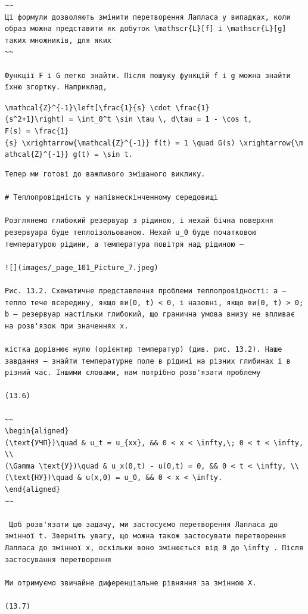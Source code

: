 \documentclass[
  ukrainian,
]{article}
\begin{document}
\begin{verbatim}
~~
Ці формули дозволяють змінити перетворення Лапласа у випадках, коли образ можна представити як добуток \mathscr{L}[f] і \mathscr{L}[g] таких множників, для яких
~~

Функції F і G легко знайти. Після пошуку функцій f і g можна знайти їхню згортку. Наприклад,
\end{verbatim}

\texttt{\textbackslash{}mathcal\{Z\}\^{}\{-1\}\textbackslash{}left{[}\textbackslash{}frac\{1\}\{s\}\ \textbackslash{}cdot\ \textbackslash{}frac\{1\}\{s\^{}2+1\}\textbackslash{}right{]}\ =\ \textbackslash{}int\_0\^{}t\ \textbackslash{}sin\ \textbackslash{}tau\ \textbackslash{},\ d\textbackslash{}tau\ =\ 1\ -\ \textbackslash{}cos\ t,}
\texttt{F(s)\ =\ \textbackslash{}frac\{1\}\{s\}\ \textbackslash{}xrightarrow\{\textbackslash{}mathcal\{Z\}\^{}\{-1\}\}\ f(t)\ =\ 1\ \textbackslash{}quad\ G(s)\ \textbackslash{}xrightarrow\{\textbackslash{}mathcal\{Z\}\^{}\{-1\}\}\ g(t)\ =\ \textbackslash{}sin\ t.}

\begin{verbatim}
Тепер ми готові до важливого змішаного виклику.

# Теплопровідність у напівнескінченному середовищі

Розглянемо глибокий резервуар з рідиною, і нехай бічна поверхня резервуара буде теплоізольованою. Нехай u_0 буде початковою температурою рідини, а температура повітря над рідиною —

![](images/_page_101_Picture_7.jpeg)

Рис. 13.2. Схематичне представлення проблеми теплопровідності: a — тепло тече всередину, якщо ви(0, t) < 0, і назовні, якщо ви(0, t) > 0; b — резервуар настільки глибокий, що гранична умова внизу не впливає на розв'язок при значеннях x.

кістка дорівнює нулю (орієнтир температур) (див. рис. 13.2). Наше завдання — знайти температурне поле в рідині на різних глибинах і в різний час. Іншими словами, нам потрібно розв'язати проблему

(13.6)

~~
\begin{aligned}
(\text{УЧП})\quad & u_t = u_{xx}, && 0 < x < \infty,\; 0 < t < \infty, \\
(\Gamma \text{У})\quad & u_x(0,t) - u(0,t) = 0, && 0 < t < \infty, \\
(\text{НУ})\quad & u(x,0) = u_0, && 0 < x < \infty.
\end{aligned}
~~

 Щоб розв'язати цю задачу, ми застосуємо перетворення Лапласа до змінної t. Зверніть увагу, що можна також застосувати перетворення Лапласа до змінної x, оскільки воно змінюється від 0 до \infty . Після застосування перетворення

Ми отримуємо звичайне диференціальне рівняння за змінною X.

(13.7)
\end{verbatim}
\end{document}
